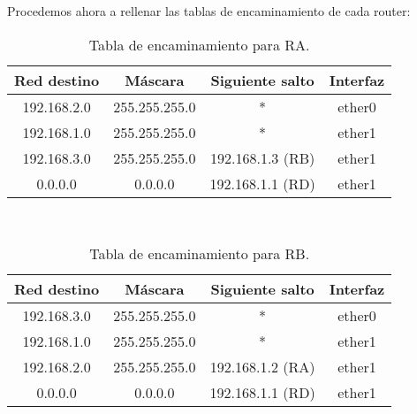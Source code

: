 \begin{ejercicio}
\begin{itemize}
    \end{itemize}
    Procedemos ahora a rellenar las tablas de encaminamiento de cada router:
    \begin{table}[H]
    \centering
    \begin{tabular}{|c|c|c|c|}
        \hline
        Red destino & Máscara & Siguiente salto & Interfaz \\
        \hline
        192.168.2.0 & 255.255.255.0 & * & ether0 \\
        \hline
        192.168.1.0 & 255.255.255.0 & * & ether1 \\
        \hline
        192.168.3.0 & 255.255.255.0 & 192.168.1.3 (RB) & ether1 \\
        \hline
        0.0.0.0 & 0.0.0.0 & 192.168.1.1 (RD) & ether1 \\
        \hline
    \end{tabular}\\
    \caption{Tabla de encaminamiento para RA.}
    \end{table}

    \begin{table}[H]
        \centering
        \begin{tabular}{|c|c|c|c|}
            \hline
            Red destino & Máscara & Siguiente salto & Interfaz \\
            \hline
            192.168.3.0 & 255.255.255.0 & * & ether0 \\
            \hline
            192.168.1.0 & 255.255.255.0 & * & ether1 \\
            \hline
            192.168.2.0 & 255.255.255.0 & 192.168.1.2 (RA) & ether1 \\
            \hline
            0.0.0.0 & 0.0.0.0 & 192.168.1.1 (RD) & ether1 \\
            \hline
        \end{tabular}\\
        \caption{Tabla de encaminamiento para RB.}
        \end{table}


\end{ejercicio}
